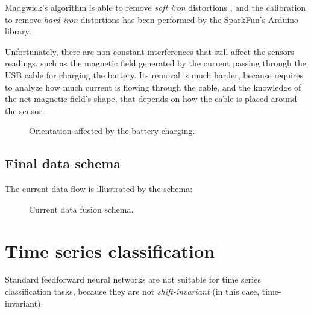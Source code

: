Madgwick's algorithm is able to remove \textit{soft iron} distortions \cite[11-12]{Mad10}, and the calibration to remove \textit{hard iron} distortions has been performed by the SparkFun's Arduino library.
\bigbreak

Unfortunately, there are non-constant interferences that still affect the sensors readings, such as the magnetic field generated by the current passing through the USB cable for charging the battery.
Its removal is much harder, because requires to analyze how much current is flowing through the cable, and the knowledge of the net magnetic field's shape, that depends on how the cable is placed around the sensor.

\begin{center}
	\begin{figure}[ht]
		\caption{Orientation affected by the battery charging.}
	\end{figure}
\end{center}

\subsection{Final data schema}
The current data flow is illustrated by the schema:

\begin{center}
	\begin{figure}[ht]
		\caption{Current data fusion schema.}
	\end{figure}
\end{center}

\section{Time series classification}
Standard feedforward neural networks are not suitable for time series classification tasks, because they are not \textit{shift-invariant} (in this case, time-invariant).

